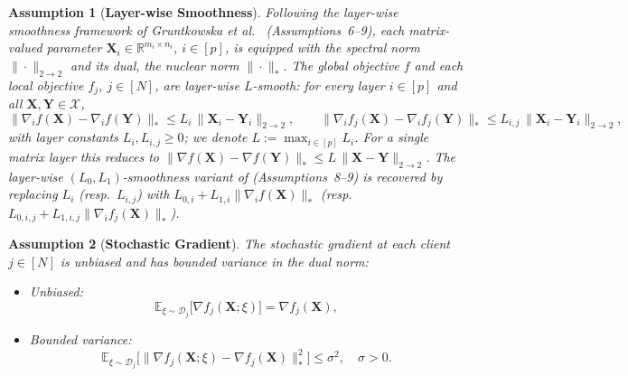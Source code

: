 \documentclass{article}
\newtheorem{assumption}{Assumption}
\begin{document}
\begin{assumption}[\textbf{Layer-wise Smoothness}]\label{as:2}
Following the layer-wise smoothness framework of Gruntkowska et al.~\cite{gruntkowska2025error} (Assumptions~6--9), each matrix-valued parameter $\mathbf{X}_i \in \mathbb{R}^{m_i \times n_i}$, $i \in [p]$, is equipped with the spectral norm $\|\cdot\|_{2\to 2}$ and its dual, the nuclear norm $\|\cdot\|_{*}$. The global objective $f$ and each local objective $f_j$, $j \in [N]$, are layer-wise $L$-smooth: for every layer $i \in [p]$ and all $\mathbf{X}, \mathbf{Y} \in \mathcal{X}$,
\begin{equation}
\|\nabla_i f(\mathbf{X}) - \nabla_i f(\mathbf{Y})\|_{*} \le L_i\,\|\mathbf{X}_i - \mathbf{Y}_i\|_{2\to 2}, \qquad
\|\nabla_i f_j(\mathbf{X}) - \nabla_i f_j(\mathbf{Y})\|_{*} \le L_{i,j}\,\|\mathbf{X}_i - \mathbf{Y}_i\|_{2\to 2},
\end{equation}
with layer constants $L_i, L_{i,j} \ge 0$; we denote $L := \max_{i \in [p]} L_i$. For a single matrix layer this reduces to $\|\nabla f(\mathbf{X}) - \nabla f(\mathbf{Y})\|_{*} \le L\,\|\mathbf{X} - \mathbf{Y}\|_{2\to 2}$. The layer-wise $(L_0, L_1)$-smoothness variant of \cite{gruntkowska2025error} (Assumptions~8--9) is recovered by replacing $L_i$ (resp.\ $L_{i,j}$) with $L_{0,i} + L_{1,i}\|\nabla_i f(\mathbf{X})\|_{*}$ (resp.\ $L_{0,i,j} + L_{1,i,j}\|\nabla_i f_j(\mathbf{X})\|_{*}$).
\end{assumption}

\begin{assumption}[\textbf{Stochastic Gradient}]\label{as:3}
The stochastic gradient at each client $j \in [N]$ is unbiased and has bounded variance in the dual norm:
\begin{itemize}
    \item Unbiased: \begin{equation}
    \mathbb{E}_{\xi \sim \mathcal{D}_j}\bigl[\nabla f_j(\mathbf{X};\xi)\bigr] = \nabla f_j(\mathbf{X}),
    \end{equation}
    \item Bounded variance: \begin{equation}
    \mathbb{E}_{\xi \sim \mathcal{D}_j}\bigl[\|\nabla f_j(\mathbf{X};\xi) - \nabla f_j(\mathbf{X})\|_*^2\bigr] \le \sigma^2, \quad \sigma > 0.
    \end{equation}
\end{itemize}
\end{assumption}

\end{document}
